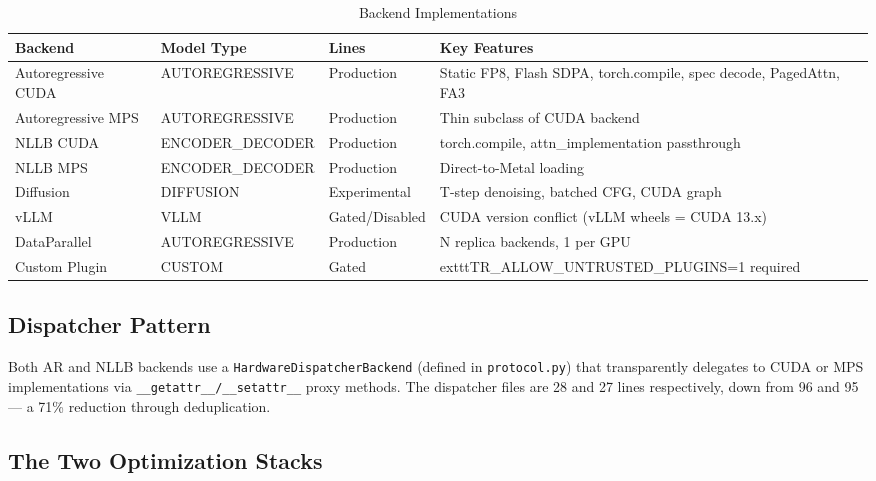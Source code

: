 \documentclass[11pt,a4paper,twoside]{article}
\begin{document}
\begin{table}[H]
\centering
\caption{Backend Implementations}
\label{tab:backends}
\begin{tabular}{lp{2.5cm}p{2.5cm}p{4cm}}
\toprule
\textbf{Backend} & \textbf{Model Type} & \textbf{Lines} & \textbf{Key Features} \\
\midrule
Autoregressive CUDA & AUTOREGRESSIVE & Production & Static FP8, Flash SDPA,
                     torch.compile, spec decode, PagedAttn, FA3 \\
Autoregressive MPS & AUTOREGRESSIVE & Production & Thin subclass of CUDA backend \\
NLLB CUDA & ENCODER\_DECODER & Production & torch.compile, attn\_implementation passthrough \\
NLLB MPS & ENCODER\_DECODER & Production & Direct-to-Metal loading \\
Diffusion & DIFFUSION & Experimental & T-step denoising, batched CFG, CUDA graph \\
vLLM & VLLM & Gated/Disabled & CUDA version conflict (vLLM wheels = CUDA 13.x) \\
DataParallel & AUTOREGRESSIVE & Production & N replica backends, 1 per GPU \\
Custom Plugin & CUSTOM & Gated & 	exttt{TR\_ALLOW\_UNTRUSTED\_PLUGINS=1} required \\
\bottomrule
\end{tabular}
\end{table}

\subsection{Dispatcher Pattern}

Both AR and NLLB backends use a \texttt{HardwareDispatcherBackend} (defined in
\texttt{protocol.py}) that transparently delegates to CUDA or MPS implementations
via \texttt{\_\_getattr\_\_/\_\_setattr\_\_} proxy methods. The dispatcher files
are 28 and 27 lines respectively, down from 96 and 95 --- a 71\% reduction through
deduplication.

\subsection{The Two Optimization Stacks}
\end{document}
